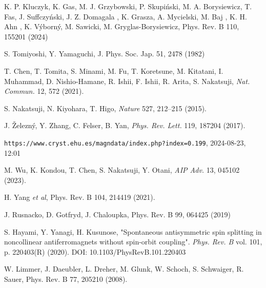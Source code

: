 \documentclass[prb,showpacs,amsmath,amssymb,superscriptaddress,twocolumn,floatfix]{revtex4-1}
\begin{document}
\begin{thebibliography}{99}
 K. P. Kluczyk, K. Gas, M. J. Grzybowski, P. Skupi\'nski, M. A. Borysiewicz, T. Fas, J. Suffczy\'nski, J. Z. Domagala , K. Grasza, A. Mycielski, M. Baj , K. H. Ahn , K. V\'yborn\'y, M. Sawicki, M. Gryglas-Borysiewicz, Phys. Rev. B 110, 155201 (2024)

 S. Tomiyoshi, Y. Yamaguchi, J. Phys. Soc. Jap. 51, 2478 (1982)

 T. Chen, T. Tomita, S. Minami, M. Fu, T. Koretsune, M. Kitatani, I. Muhammad, D. Nishio-Hamane, R. Ishii, F. Ishii, R. Arita, S. Nakatsuji, \textit{Nat. Commun.} 12, 572 (2021). %

 S. Nakatsuji, N. Kiyohara, T. Higo, \textit{Nature} 527, 212–215 (2015). %

 J. \v{Z}elezn\'y, Y. Zhang, C. Felser, B. Yan, \textit{Phys. Rev. Lett.} 119, 187204 (2017). %

\texttt{https://www.cryst.ehu.es/magndata/index.php?index=0.199}, 2024-08-23, 12:01

 M. Wu, K. Kondou, T. Chen, S. Nakatsuji, Y. Otani, \textit{AIP Adv.} 13, 045102 (2023). %

 H. Yang \textit{et al}, Phys. Rev. B 104, 214419 (2021).

 J. Rusnacko, D. Gotfryd, J. Chaloupka, Phys. Rev. B 99, 064425 (2019)

 S. Hayami, Y. Yanagi, H. Kusunose, "Spontaneous antisymmetric spin splitting in noncollinear antiferromagnets without spin-orbit coupling". \textit{Phys. Rev. B} vol. 101, p. 220403(R) (2020). DOI: 10.1103/PhysRevB.101.220403

 W. Limmer, J. Daeubler, L. Dreher, M. Glunk, W. Schoch, S. Schwaiger, R. Sauer, Phys. Rev. B 77, 205210 (2008). %






\end{thebibliography}
\end{document}

